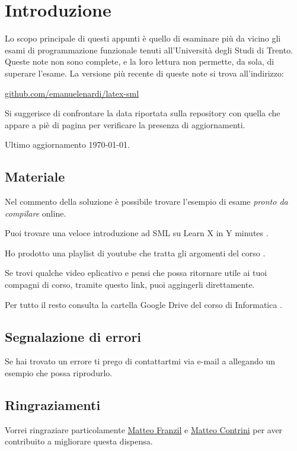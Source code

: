 \section*{Introduzione}

Lo scopo principale di questi appunti è quello di esaminare più da vicino gli esami di programmazione funzionale tenuti all'Università degli Studi di Trento. Queste note non sono complete, e la loro lettura non permette, da sola, di superare l’esame. La versione più recente di queste note si trova all'indirizzo:

\begin{center}
	\url{github.com/emanuelenardi/latex-sml}
\end{center}

Si suggerisce di confrontare la data riportata sulla repository con quella che appare a piè di pagina per verificare la presenza di aggiornamenti.

\smallskip
Ultimo aggiornamento \today.

\subsection*{Materiale}

Nel commento della soluzione è possibile trovare l'esempio di esame \emph{pronto da compilare} online.

\smallskip
Puoi trovare una veloce introduzione ad SML su Learn X in Y minutes %
\href{https://learnxinyminutes.com/docs/standard-ml/}{\ExternalLink}.

\smallskip
Ho prodotto una playlist di youtube che tratta gli argomenti del corso %
\href{bit.ly/sml-youtube-playlist}{\ExternalLink}.

\smallskip
Se trovi qualche video eplicativo e pensi che possa ritornare utile ai tuoi compagni di corso, tramite questo link, puoi aggingerli direttamente.

\smallskip
Per tutto il resto consulta la cartella Google Drive del corso di Informatica %
\href{https://bit.ly/drive-folder}{\ExternalLink}.

\subsection*{Segnalazione di errori}

Se hai trovato un errore ti prego di contattartmi via e-mail a  allegando un esempio che possa riprodurlo.
\subsection*{Ringraziamenti}

Vorrei ringraziare particolamente \href{https://github.com/mfranzil}{Matteo Franzil} e \href{https://github.com/matteocontrini}{Matteo Contrini} per aver contribuito a migliorare questa dispensa.

